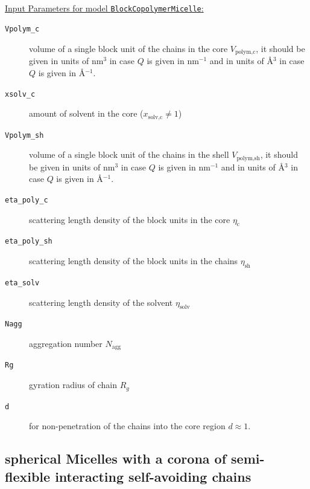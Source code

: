 \hspace{1pt}\\
\uline{Input Parameters for model \texttt{BlockCopolymerMicelle}:}\\
\begin{description}
\item[\texttt{Vpolym\_c}] volume of a single block unit of the chains in the core $V_\text{polym,c}$,
     it should be given in units of nm$^3$ in case $Q$ is given in nm$^{-1}$ and in units of \AA$^3$
     in case $Q$ is given in \AA$^{-1}$.
\item[\texttt{xsolv\_c}] amount of solvent in the core ($x_\text{solv,c}\neq 1$)
\item[\texttt{Vpolym\_sh}] volume of a single block unit of the chains in the shell $V_\text{polym,sh}$,
     it should be given in units of nm$^3$ in case $Q$ is given in nm$^{-1}$ and in units of \AA$^3$
     in case $Q$ is given in \AA$^{-1}$.
\item[\texttt{eta\_poly\_c}] scattering length density of the block units in the core $\eta_\text{c}$
\item[\texttt{eta\_poly\_sh}] scattering length density of the block units in the chains $\eta_\text{sh}$
\item[\texttt{eta\_solv}] scattering length density of the solvent $\eta_\text{solv}$
\item[\texttt{Nagg}] aggregation number $N_\text{agg}$
\item[\texttt{Rg}] gyration radius of chain $R_g$
\item[\texttt{d}] for non-penetration of the chains into the core region $d\approx 1$.
\end{description}


\subsection{spherical Micelles with a corona of semi-flexible interacting self-avoiding chains}
